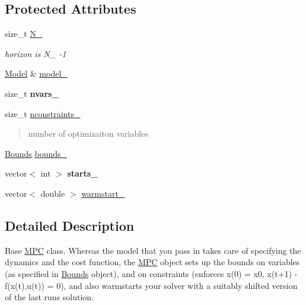 \subsection*{Protected Attributes}
\begin{DoxyCompactItemize}
\item 
\mbox{\label{classMPC_a2b810b20d87323cce8285d14230c917c}} 
size\+\_\+t \mbox{\hyperlink{classMPC_a2b810b20d87323cce8285d14230c917c}{N\+\_\+}}
\begin{DoxyCompactList}\small\item\em horizon is N\+\_\+ -\/1 \end{DoxyCompactList}\item 
\mbox{\hyperlink{classModel}{Model}} \& \mbox{\hyperlink{classMPC_abbf9a3b26a6cbc6cad87cac1c8f2aaaf}{model\+\_\+}}
\item 
\mbox{\label{classMPC_a9a9db53c26d46e7579d02a5d08c0358c}} 
size\+\_\+t {\bfseries nvars\+\_\+}
\item 
\mbox{\label{classMPC_ac89334cea51103f0a4a20268b7d748ef}} 
size\+\_\+t \mbox{\hyperlink{classMPC_ac89334cea51103f0a4a20268b7d748ef}{nconstraints\+\_\+}}
\begin{DoxyCompactList}\small\item\em \begin{quote}
number of optimizaiton variables\end{quote}
\end{DoxyCompactList}\item 
\mbox{\hyperlink{structBounds}{Bounds}} \mbox{\hyperlink{classMPC_a821e5a57b25e8c83aaae02d44dab3ea8}{bounds\+\_\+}}
\item 
\mbox{\label{classMPC_af52144a70629c4809d28790fd7c0fdf3}} 
vector$<$ int $>$ {\bfseries starts\+\_\+}
\item 
vector$<$ double $>$ \mbox{\hyperlink{classMPC_a89874cd77d24cc8c7294c6643931e064}{warmstart\+\_\+}}
\end{DoxyCompactItemize}


\subsection{Detailed Description}
Base \mbox{\hyperlink{classMPC}{M\+PC}} class. Whereas the model that you pass in takes care of specifying the dynamics and the cost function, the \mbox{\hyperlink{classMPC}{M\+PC}} object sets up the bounds on variables (as specified in \mbox{\hyperlink{structBounds}{Bounds}} object), and on constraints (enforces x(0) = x0, x(t+1) -\/ f(x(t),u(t)) = 0), and also warmstarts your solver with a suitably shifted version of the last run\textquotesingle{}s solution. 

